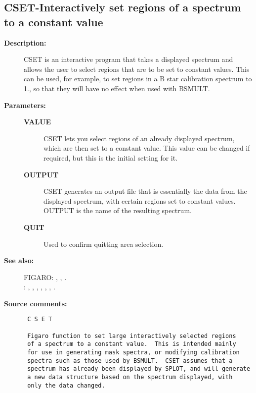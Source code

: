 \subsection{CSET-\label{CSET}Interactively set regions of a spectrum to a constant value}
\begin{description}

\item [{\bf Description:}]
 CSET is an interactive program that takes a displayed spectrum
 and allows the user to select regions that are to be set to
 constant values.  This can be used, for example, to set regions
 in a B star calibration spectrum to 1., so that they will have
 no effect when used with BSMULT.

\item [{\bf Parameters:}]
\begin{description}
\item [{\bf VALUE}]
 CSET lets you select regions of an already displayed spectrum, which
 are then set to a constant value.  This value can be changed if
 required, but this is the initial setting for it.
\item [{\bf OUTPUT}]
 CSET generates an output file that is essentially the data from the
 displayed spectrum, with certain regions set to constant values.
 OUTPUT is the name of the resulting spectrum.
\item [{\bf QUIT}]
 Used to confirm quitting area selection.
\end{description}

\item [{\bf See also:}]
FIGARO: , , .\\
: , , , , , , .\\

\item [{\bf Source comments:}]
\begin{verbatim}
 C S E T

 Figaro function to set large interactively selected regions
 of a spectrum to a constant value.  This is intended mainly
 for use in generating mask spectra, or modifying calibration
 spectra such as those used by BSMULT.  CSET assumes that a
 spectrum has already been displayed by SPLOT, and will generate
 a new data structure based on the spectrum displayed, with
 only the data changed.


\end{verbatim}
\end{description}
